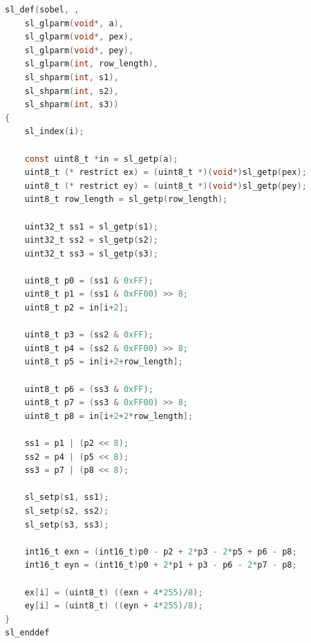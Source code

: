 \documentclass[a4paper,fontsize=12pt]{scrartcl}
\begin{document}
\begin{lstlisting}[language=C]
sl_def(sobel, , 
	sl_glparm(void*, a),
	sl_glparm(void*, pex),
	sl_glparm(void*, pey),
	sl_glparm(int, row_length),
	sl_shparm(int, s1), 
	sl_shparm(int, s2),
	sl_shparm(int, s3))
{
	sl_index(i);
	
	const uint8_t *in = sl_getp(a);
	uint8_t (* restrict ex) = (uint8_t *)(void*)sl_getp(pex);
	uint8_t (* restrict ey) = (uint8_t *)(void*)sl_getp(pey);
	uint8_t row_length = sl_getp(row_length);
	
	uint32_t ss1 = sl_getp(s1);
	uint32_t ss2 = sl_getp(s2);
	uint32_t ss3 = sl_getp(s3);
	
	uint8_t p0 = (ss1 & 0xFF);
	uint8_t p1 = (ss1 & 0xFF00) >> 8;
	uint8_t p2 = in[i+2];
	
	uint8_t p3 = (ss2 & 0xFF);
	uint8_t p4 = (ss2 & 0xFF00) >> 8;
	uint8_t p5 = in[i+2+row_length];
	
	uint8_t p6 = (ss3 & 0xFF);
	uint8_t p7 = (ss3 & 0xFF00) >> 8;
	uint8_t p8 = in[i+2+2*row_length];
		
	ss1 = p1 | (p2 << 8);
	ss2 = p4 | (p5 << 8);
	ss3 = p7 | (p8 << 8);
	
	sl_setp(s1, ss1);
	sl_setp(s2, ss2);
	sl_setp(s3, ss3);
		
	int16_t exn = (int16_t)p0 - p2 + 2*p3 - 2*p5 + p6 - p8;
	int16_t eyn = (int16_t)p0 + 2*p1 + p3 - p6 - 2*p7 - p8;

	ex[i] = (uint8_t) ((exn + 4*255)/8);
	ey[i] = (uint8_t) ((eyn + 4*255)/8);
}
sl_enddef
\end{lstlisting}
\end{document}
